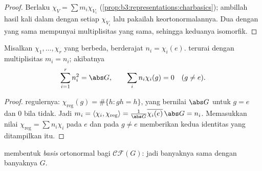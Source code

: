 \begin{proof}
Berlaku $\chi_V = \sum m_i\chi_{V_i}$
(\cref{prop:b3:representations:charbasics}); ambillah hasil kali dalam
dengan setiap $\chi_{V_i}$ lalu pakailah keortonormalannya. Dua
 dengan  yang sama mempunyai multiplisitas yang sama,
sehingga keduanya isomorfik.
\end{proof}

\begin{theorem}
\label{thm:b3:representations:regular}
Misalkan $\chi_1, \dots, \chi_r$   yang
berbeda, berderajat $n_i = \chi_i(e)$.  terurai dengan multiplisitas $m_i = n_i$;
akibatnya
\[
\sum_{i=1}^{r} n_i^2 = \abs G,
\qquad
\sum_i n_i\chi_i(g) = 0 \quad (g \neq e).
\]
\end{theorem}

\begin{proof}
 regulernya: $\chi_{\mathrm{reg}}(g) =
\#\{h : gh = h\}$, yang bernilai $\abs G$ untuk $g = e$ dan $0$
bila tidak. Jadi $m_i = \langle \chi_i,\chi_{\mathrm{reg}}\rangle =
\frac1{\abs G}\overline{\chi_i(e)}\,\abs G = n_i$. Memasukkan nilai
$\chi_{\mathrm{reg}} = \sum n_i\chi_i$ pada $e$ dan pada $g \neq e$
memberikan kedua identitas yang ditampilkan itu.
\end{proof}

\begin{theorem}\label{thm:b3:representations:numberirr}
  membentuk \emph{basis} ortonormal bagi
$\mathcal{CF}(G)$: jadi banyaknya 
sama dengan banyaknya  $G$.
\end{theorem}


